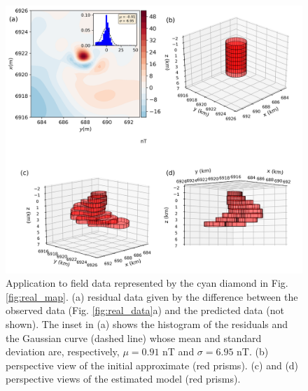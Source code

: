 \begin{figure}
    \centering
    \includegraphics[scale=.5]{figures/real_results.png}
    \caption{Application to field data represented by the cyan diamond in Fig. \ref{fig:real_map}. (a) residual data given by the difference between the observed data (Fig. \ref{fig:real_data}a) and the predicted data (not shown). The inset in (a) shows the histogram of the residuals and the Gaussian curve (dashed line) whose mean and standard deviation are, respectively, $\mu = 0.91$ nT and $\sigma=6.95$ nT. (b) perspective view of the initial approximate (red prisms). (c) and (d) perspective views of the estimated model (red prisms). 
}
    \label{fig:real_result}
\end{figure}

